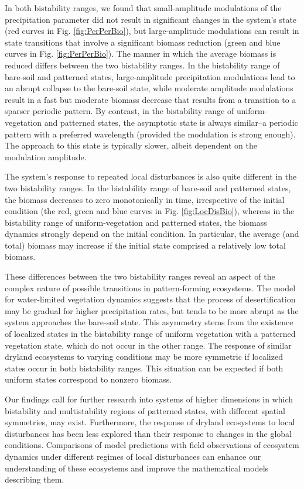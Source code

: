 \documentclass[aps,prl,preprint,superscriptaddress,floatfix]{revtex4-1}
\begin{document}
In both bistability ranges, we found that small-amplitude modulations of the precipitation parameter did not result in significant changes in the system's state (red curves in Fig. \ref{fig:PerPerBio}), 
but large-amplitude modulations can result in state transitions that involve a significant biomass reduction (green and blue curves in Fig. \ref{fig:PerPerBio}). 
The manner in which the average biomass is reduced differs between the two bistability ranges. 
In the bistability range of bare-soil and patterned states, large-amplitude precipitation modulations lead to an abrupt collapse to the bare-soil state, 
while moderate amplitude modulations result in a fast but moderate biomass decrease that results from a transition to a sparser periodic pattern.
By contrast, in the bistability range of uniform-vegetation and patterned states, the asymptotic state is always similar--a periodic pattern with a preferred wavelength (provided the modulation is strong enough). 
The approach to this state is typically slower, albeit dependent on the modulation amplitude.

The system's response to repeated local disturbances is also quite different in the two bistability ranges.
In the bistability range of bare-soil and patterned states, the biomass decreases to zero monotonically in time, irrespective of the initial condition (the red, green and blue curves in Fig. \ref{fig:LocDisBio}), 
whereas in the bistability range of uniform-vegetation and patterned states, the biomass dynamics strongly depend on the initial condition. 
In particular, the average (and total) biomass may increase if the initial state comprised a relatively low total biomass.

These differences between the two bistability ranges reveal an aspect of the complex nature of possible transitions in pattern-forming ecosystems.
The model for water-limited vegetation dynamics suggests that the process of desertification may be gradual for higher precipitation rates, but tends to be more abrupt as the system approaches the bare-soil state.
This asymmetry stems from the existence of localized states in the bistability range of uniform vegetation with a patterned vegetation state, which do not occur in the other range. 
The response of similar dryland ecosystems to varying conditions may be more symmetric if localized states occur in both bistability ranges. 
This situation can be expected if both uniform states correspond to nonzero biomass.

Our findings call for further research into systems of higher dimensions in which bistability and multistability regions of patterned states, with different spatial symmetries, may exist.
Furthermore, the response of dryland ecosystems to local disturbances has been less explored than their response to changes in the global conditions. 
Comparisons of model predictions with field observations of ecosystem dynamics under different regimes of local disturbances can enhance our understanding of these ecosystems and improve the mathematical models describing them.
\end{document}
